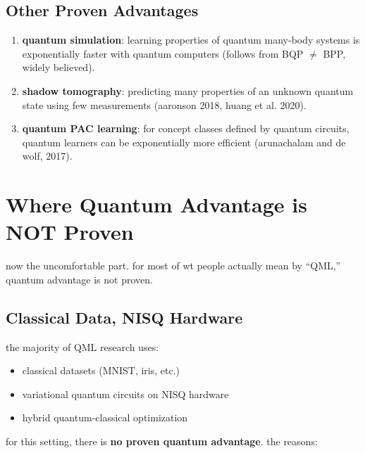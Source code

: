 \documentclass[11pt,a4paper]{article}
\theoremstyle{definition}
\theoremstyle{remark}
\begin{document}
\subsection{Other Proven Advantages}

\begin{enumerate}[label=\arabic*.]
    \item \textbf{quantum simulation}: learning properties of quantum many-body systems is exponentially faster with quantum computers (follows from BQP $\neq$ BPP, widely believed).

    \item \textbf{shadow tomography}: predicting many properties of an unknown quantum state using few measurements (aaronson 2018, huang et al. 2020).

    \item \textbf{quantum PAC learning}: for concept classes defined by quantum circuits, quantum learners can be exponentially more efficient (arunachalam and de wolf, 2017).
\end{enumerate}

\section{Where Quantum Advantage is NOT Proven}

now the uncomfortable part. for most of wt people actually mean by ``QML,'' quantum advantage is not proven.

\subsection{Classical Data, NISQ Hardware}

the majority of QML research uses:
\begin{itemize}[nosep]
    \item classical datasets (MNIST, iris, etc.)
    \item variational quantum circuits on NISQ hardware
    \item hybrid quantum-classical optimization
\end{itemize}

for this setting, there is \textbf{no proven quantum advantage}. the reasons:
\end{document}
